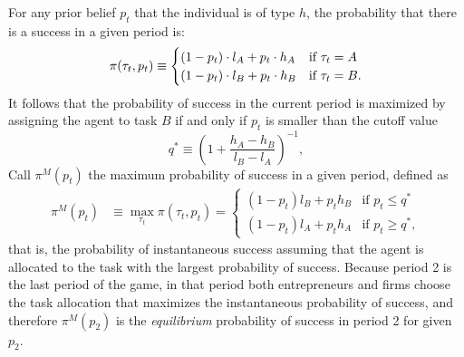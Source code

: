 \documentclass[12pt,american]{paper}
\theoremstyle{remark}
\begin{document}
For any prior belief  $p_t$  that the individual is of type $h$, the probability that there is a success in a given period is: 
\begin{equation}\label{eq:pr of success}
\pi(\tau_t,p_t)\equiv \begin{cases}
(1-p_t)\cdot l_A + p_t \cdot h_A  &\mbox{if } \tau_t=A\\
(1-p_t) \cdot l_B + p_t \cdot h_B  &\mbox{if } \tau_t=B.
\end{cases}\notag
\end{equation}
%
It follows that the probability of success in the current period is maximized by assigning the agent to task $B$ if and only if $p_t$ is smaller than the cutoff value
\begin{equation}
q^* \equiv \left(1+ \frac{h_A-h_B}{l_B-l_A} \right)^{-1},
\end{equation}
%
Call  $\pi^M(p_t)$ the maximum probability of success in a given period, defined as
\begin{align}\label{maxp}
\pi^M(p_t)&\equiv\max_{\tau_t}\pi(\tau_t,p_t)
=\begin{cases} 
(1-p_t) l_B + p_t h_B &\mbox{if } p_t \leq q^*\\
(1-p_t) l_A + p_t h_A & \mbox{if } p_t \geq q^* ,
\end{cases}
\end{align}
that is, the probability of instantaneous success assuming that the agent is allocated to the task with the largest probability of success. Because period 2 is the last period of the game, in that period both entrepreneurs and firms choose the task allocation that maximizes the instantaneous probability of success, and therefore $\pi^M(p_2)$ is the \textit{equilibrium} probability of success in period 2 for given $p_2$. %
\end{document}
